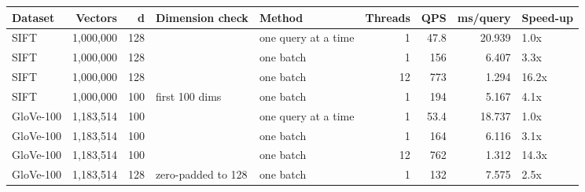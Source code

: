 \begin{tabular}{lrrllrrrl}
\toprule
Dataset & Vectors & d & Dimension check & Method & Threads & QPS & ms/query & Speed-up \\
\midrule
SIFT & 1,000,000 & 128 &  & one query at a time & 1 & 47.8 & 20.939 & 1.0x \\
SIFT & 1,000,000 & 128 &  & one batch & 1 & 156 & 6.407 & 3.3x \\
SIFT & 1,000,000 & 128 &  & one batch & 12 & 773 & 1.294 & 16.2x \\
SIFT & 1,000,000 & 100 & first 100 dims & one batch & 1 & 194 & 5.167 & 4.1x \\
GloVe-100 & 1,183,514 & 100 &  & one query at a time & 1 & 53.4 & 18.737 & 1.0x \\
GloVe-100 & 1,183,514 & 100 &  & one batch & 1 & 164 & 6.116 & 3.1x \\
GloVe-100 & 1,183,514 & 100 &  & one batch & 12 & 762 & 1.312 & 14.3x \\
GloVe-100 & 1,183,514 & 128 & zero-padded to 128 & one batch & 1 & 132 & 7.575 & 2.5x \\
\bottomrule
\end{tabular}

